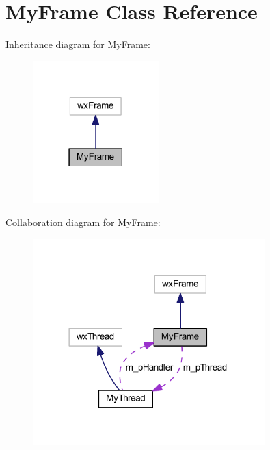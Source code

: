 \hypertarget{class_my_frame}{\section{My\-Frame Class Reference}
\label{class_my_frame}
}


Inheritance diagram for My\-Frame\-:
\nopagebreak
\begin{figure}[H]
\begin{center}
\leavevmode
\includegraphics[width=138pt]{class_my_frame__inherit__graph}
\end{center}
\end{figure}


Collaboration diagram for My\-Frame\-:
\nopagebreak
\begin{figure}[H]
\begin{center}
\leavevmode
\includegraphics[width=254pt]{class_my_frame__coll__graph}
\end{center}
\end{figure}
